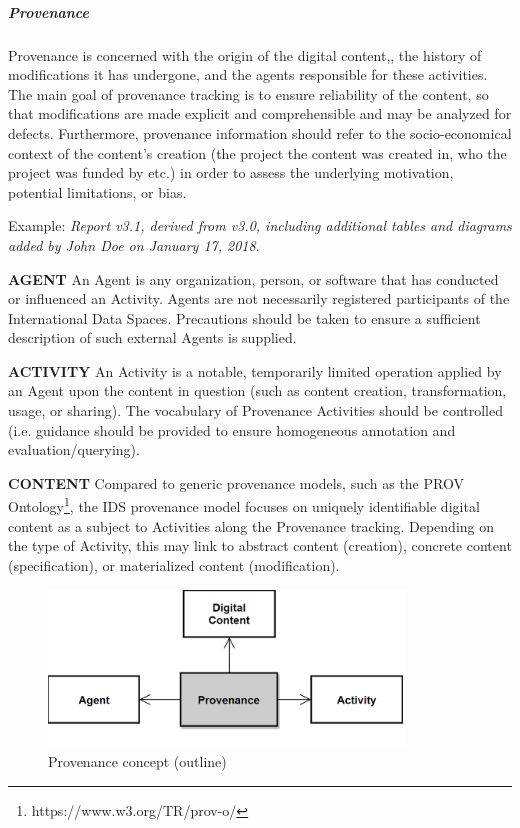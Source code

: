 \subparagraph*{Provenance}
Provenance is concerned with the origin of the digital content,, the history of modifications it has undergone, and the agents responsible for these activities. The main goal of provenance tracking is to ensure reliability of the content, so that modifications are made explicit and comprehensible and may be analyzed for defects. Furthermore, provenance information should refer to the socio-economical context of the content’s creation (the project the content was created in, who the project was funded by etc.) in order to assess the underlying motivation, potential limitations, or bias. 

Example: \textit{Report v3.1, derived from v3.0, including additional tables and diagrams added by John Doe on January 17, 2018}.



\textbf{AGENT} An Agent is any organization, person, or software that has conducted or influenced an Activity. Agents are not necessarily registered participants of the International Data Spaces. Precautions should be taken to ensure a sufficient description of such external Agents is supplied.

\textbf{ACTIVITY} An Activity is a notable, temporarily limited operation applied by an Agent upon the content in question (such as content creation, transformation, usage, or sharing). The vocabulary of Provenance Activities should be controlled (i.e. guidance should be provided to ensure homogeneous annotation and evaluation/querying).


\textbf{CONTENT} Compared to generic provenance models, such as the PROV Ontology\footnote{ https://www.w3.org/TR/prov-o/ }, the IDS provenance model focuses on uniquely identifiable digital content as a subject to Activities along the Provenance tracking. Depending on the type of Activity, this may link to abstract content (creation), concrete content (specification), or materialized content (modification). 




\begin{figure}[H]
	\begin{Center}
		\includegraphics[width=3.74in,height=1.65in]{./media/image44.png}
		\caption{Provenance concept (outline)}
		\label{fig:Provenance_concept_outline}
	\end{Center}
\end{figure}


